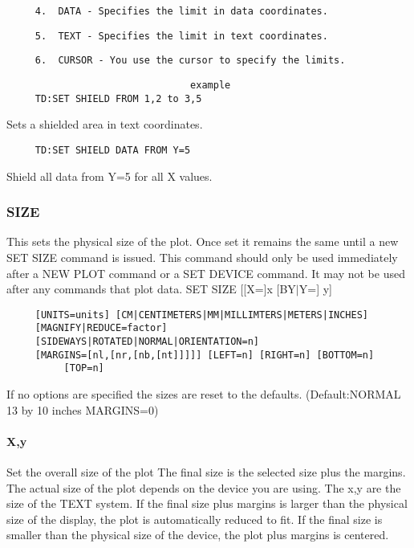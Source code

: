 \begin{verbatim}
     4.  DATA - Specifies the limit in data coordinates.  
\end{verbatim}

\begin{verbatim}
     5.  TEXT - Specifies the limit in text coordinates.  
\end{verbatim}

\begin{verbatim}
     6.  CURSOR - You use the cursor to specify the limits.  
\end{verbatim}

\begin{verbatim}
                                example
     TD:SET SHIELD FROM 1,2 to 3,5 
\end{verbatim}
Sets a shielded area in text coordinates.  
\begin{verbatim}
     TD:SET SHIELD DATA FROM Y=5 
\end{verbatim}
Shield all data from Y=5 for all X values.  
\subsubsection{SIZE}
This sets the physical size of the plot.  Once set it remains the same
until a new SET SIZE command is issued.  This command should only be
used immediately after a NEW PLOT command or a SET DEVICE command.  It
may not be used after any commands that plot data.  
SET SIZE [[X=]x [BY$|$Y=] y] 
\begin{verbatim}
     [UNITS=units] [CM|CENTIMETERS|MM|MILLIMTERS|METERS|INCHES] 
     [MAGNIFY|REDUCE=factor] 
     [SIDEWAYS|ROTATED|NORMAL|ORIENTATION=n] 
     [MARGINS=[nl,[nr,[nb,[nt]]]]] [LEFT=n] [RIGHT=n] [BOTTOM=n]
          [TOP=n] 
\end{verbatim}
If no options are specified the sizes are reset to the defaults.  
(Default:NORMAL 13 by 10 inches MARGINS=0) 
\paragraph{X,y}
Set  the overall size of the plot The final size is the selected size
plus the margins.  The actual size of the plot depends on the  device
you  are  using.   The  x,y  are the size of the TEXT system.  If the
final size plus margins is larger  than  the  physical  size  of  the
display, the plot is automatically reduced to fit.  If the final size
is smaller than the physical  size  of  the  device,  the  plot  plus
margins is centered.  
